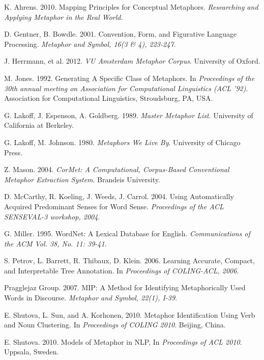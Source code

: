 \documentclass[12pt]{article}
\begin{document}
\newpage
\begin{thebibliography}{9}

  K. Ahrens. 2010.
  Mapping Principles for Conceptual Metaphors.
  \emph{Researching and Applying Metaphor in the Real World}.

  D. Gentner, B. Bowdle. 2001.
  Convention, Form, and Figurative Language Processing.
  \emph{Metaphor and Symbol, 16(3 \& 4), 223-247}.

  J. Herrmann, et al.  2012.
  \emph{VU Amsterdam Metaphor Corpus}.
  University of Oxford.

  M. Jones. 1992.
  Generating A Specific Class of Metaphors.
  In \emph{Proceedings of the 30th annual meeting on Association for Computational Linguistics (ACL '92)}. Association for Computational Linguistics, Stroudsburg, PA, USA.
 
  G. Lakoff, J. Espenson, A. Goldberg. 1989.
  \emph{Master Metaphor List}.
  University of California at Berkeley.
  
  G. Lakoff, M. Johnson. 1980.
  \emph{Metaphors We Live By}.
  University of Chicago Press.

  Z. Mason. 2004.
  \emph{CorMet: A Computational, Corpus-Based Conventional Metaphor Extraction System}.
  Brandeis University.

  D. McCarthy, R. Koeling, J. Weeds, J. Carrol. 2004.
  Using Automatically Acquired Predominant Senses for Word Sense.
  \emph{Proceedings of the ACL SENSEVAL-3 workshop, 2004}.

  G. Miller. 1995.
  WordNet: A Lexical Database for English.
  \emph{Communications of the ACM Vol. 38, No. 11: 39-41}.

  S. Petrov, L. Barrett, R. Thibaux, D. Klein. 2006.
  Learning Accurate, Compact, and Interpretable Tree Annotation.
  In \emph{Proceedings of COLING-ACL, 2006}.

  Pragglejaz Group. 2007.
  MIP: A Method for Identifying Metaphorically Used Words in Discourse.
  \emph{Metaphor and Symbol, 22(1), I-39}.

  E. Shutova, L. Sun, and A. Korhonen, 2010.
  Metaphor Identification Using Verb and Noun Clustering.
  In \emph{Proceedings of COLING 2010}.
  Beijing, China.
  
  E. Shutova. 2010.
  Models of Metaphor in NLP,
  In \emph{Proceedings of ACL 2010}.
  Uppsala, Sweden.

\end{thebibliography}
\end{document}

